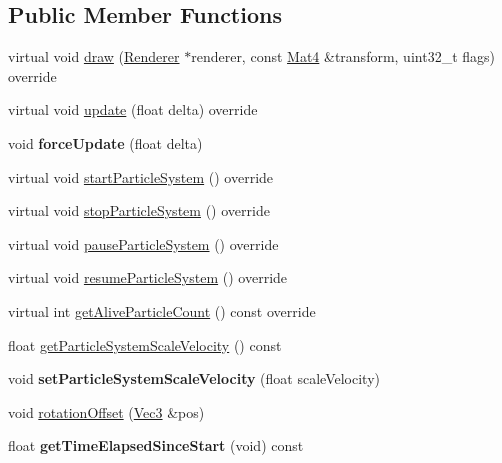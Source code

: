 \subsection*{Public Member Functions}
\begin{DoxyCompactItemize}
\item 
virtual void \hyperlink{classPUParticleSystem3D_ac4ab268d41e408ba4c2636827717cf48}{draw} (\hyperlink{classRenderer}{Renderer} $\ast$renderer, const \hyperlink{classMat4}{Mat4} \&transform, uint32\+\_\+t flags) override
\item 
virtual void \hyperlink{classPUParticleSystem3D_a9fdfe542cd05fcf270644dff49f81857}{update} (float delta) override
\item 
\mbox{\label{classPUParticleSystem3D_a9fdebd0f30d7dc8cc7873853b0fa2480}} 
void {\bfseries force\+Update} (float delta)
\item 
virtual void \hyperlink{classPUParticleSystem3D_ac3ea37e1b73f622a72d7f2576118a551}{start\+Particle\+System} () override
\item 
virtual void \hyperlink{classPUParticleSystem3D_a2fb2d3bfd5bc6b7b827e1800f34f0157}{stop\+Particle\+System} () override
\item 
virtual void \hyperlink{classPUParticleSystem3D_aff7cc367d4a38e89a3935e6a3b5a482f}{pause\+Particle\+System} () override
\item 
virtual void \hyperlink{classPUParticleSystem3D_a3a7be465950fdb5ad401eb436ec8ff32}{resume\+Particle\+System} () override
\item 
virtual int \hyperlink{classPUParticleSystem3D_a23b835c5c50aba7764c928b9edcb899c}{get\+Alive\+Particle\+Count} () const override
\item 
float \hyperlink{classPUParticleSystem3D_ada896efd6a52b7ac28e28b14e7ac6515}{get\+Particle\+System\+Scale\+Velocity} () const
\item 
\mbox{\label{classPUParticleSystem3D_a2d82e348829365b8f991795fcea6e6be}} 
void {\bfseries set\+Particle\+System\+Scale\+Velocity} (float scale\+Velocity)
\item 
void \hyperlink{classPUParticleSystem3D_ac2ff2f8940f77cc569718feabab93995}{rotation\+Offset} (\hyperlink{classVec3}{Vec3} \&pos)
\item 
\mbox{\label{classPUParticleSystem3D_ada747ecbb99f1708ac4b402048df1919}} 
float {\bfseries get\+Time\+Elapsed\+Since\+Start} (void) const

\end{DoxyCompactItemize}
